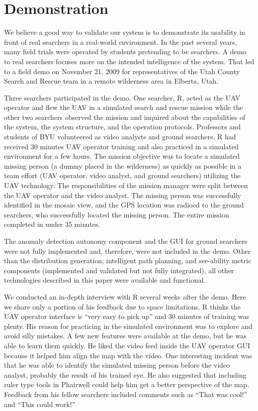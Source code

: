 \section{Demonstration}

We believe a good way to validate our system is to demonstrate its usability in front of real searchers in a real-world environment. In the past several years, many field trials were operated by students pretending to be searchers. A demo to real searchers focuses more on the intended intelligence of the system. That led to a field demo on November 21, 2009 for representatives of the Utah County Search and Rescue team in a remote wilderness area in Elberta, Utah.

Three searchers participated in the demo. One searcher, R, acted as the UAV operator and flew the UAV in a simulated search and rescue mission while the other two searchers observed the mission and inquired about the capabilities of the system, the system structure, and the operation protocols. Professors and students of BYU volunteered as video analysts and ground searchers. R had received 30 minutes UAV operator training and also practiced in a simulated environment for a few hours. The mission objective was to locate a simulated missing person (a dummy placed in the wilderness) as quickly as possible in a team effort (UAV operator, video analyst, and ground searchers) utilizing the UAV technology. The responsibilities of the mission manager were split between the UAV operator and the video analyst. The missing person was successfully identified in the mosaic view, and the GPS location was radioed to the ground searchers, who successfully located the missing person. The entire mission completed in under 35 minutes.

The anomaly detection autonomy component and the GUI for ground searchers were not fully implemented and, therefore, were not included in the demo. Other than the distribution generation, intelligent path planning, and see-ability metric components (implemented and validated but not fully integrated), all other technologies described in this paper were available and functional.

We conducted an in-depth interview with R several weeks after the demo. Here we share only a portion of his feedback due to space limitations. R thinks the UAV operator interface is ``very easy to pick up'' and 30 minutes of training was plenty. His reason for practicing in the simulated environment was to explore and avoid silly mistakes. A few new features were available at the demo, but he was able to learn them quickly. He liked the video feed inside the UAV operator GUI because it helped him align the map with the video. One interesting incident was that he was able to identify the simulated missing person before the video analyst, probably the result of his trained eye. He also suggested that including ruler type tools in Phairwell could help him get a better perspective of the map. Feedback from his fellow searchers included comments such as ``That was cool!'' and ``This could work!''

